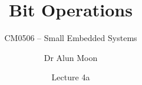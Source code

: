 \documentclass[svgnames,x11names]{beamer}
\title{Bit Operations}
\subtitle{CM0506 -- Small Embedded Systems}
\date{Lecture 4a}
\author{Dr Alun Moon}
\institute{Department of Computer and Information Science}
\begin{document}
\frame\maketitle


\end{document}
